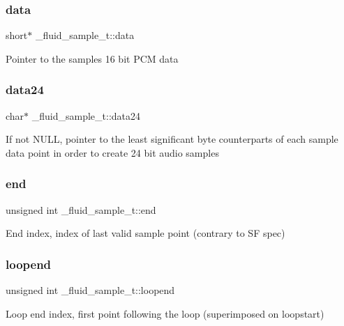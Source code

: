 \subsubsection{\texorpdfstring{data}{data}}
{\footnotesize\ttfamily short$\ast$ \+\_\+fluid\+\_\+sample\+\_\+t\+::data}

Pointer to the sample\textquotesingle{}s 16 bit P\+CM data \mbox{\label{struct__fluid__sample__t_ad2153e233ec84d2ed36a310330eec820}} 
\subsubsection{\texorpdfstring{data24}{data24}}
{\footnotesize\ttfamily char$\ast$ \+\_\+fluid\+\_\+sample\+\_\+t\+::data24}

If not N\+U\+LL, pointer to the least significant byte counterparts of each sample data point in order to create 24 bit audio samples \mbox{\label{struct__fluid__sample__t_a955d338a740c562bd9b298d87b165b0c}} 
\subsubsection{\texorpdfstring{end}{end}}
{\footnotesize\ttfamily unsigned int \+\_\+fluid\+\_\+sample\+\_\+t\+::end}

End index, index of last valid sample point (contrary to SF spec) \mbox{\label{struct__fluid__sample__t_a3baa4ca199a55b77c2692d9d3211e0d0}} 
\subsubsection{\texorpdfstring{loopend}{loopend}}
{\footnotesize\ttfamily unsigned int \+\_\+fluid\+\_\+sample\+\_\+t\+::loopend}

Loop end index, first point following the loop (superimposed on loopstart) \mbox{\label{struct__fluid__sample__t_a708e728c1dd67bb62a70e4edd7fc1f1c}} 
